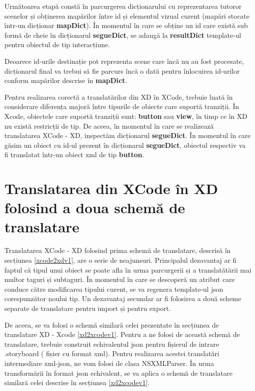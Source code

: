 Următoarea etapă constă în parcurgerea dicționarului cu reprezentarea tutoror scenelor și obținerea mapărilor între id și elementul vizual curent (mapări stocate într-un dicționar \textbf{mapDict}). În momentul în care se obține un id care există sub formă de cheie în dicționarul \textbf{segueDict}, se adaugă la \textbf{resultDict} template-ul pentru obiectul de tip interacțiune. 

Deoarece id-urile destinație pot reprezenta scene care încă nu au fost procesate, dicționarul final va trebui să fie parcurs încă o dată pentru înlocuirea id-urilor conform mapărilor descrise în \textbf{mapDict}.

Pentru realizarea corectă a translatărilor din XD în XCode, trebuie luată în considerare diferența majoră între tipurile de obiecte care suportă tranziții. În Xcode, obiectele care suportă tranziții sunt: \textbf{button} sau \textbf{view}, în timp ce în XD nu există restricții de tip. De aceea, în momentul în care se realizează translatarea XCode - XD, inspectăm dicționarul \textbf{segueDict}. În momentul în care găsim un obiect cu id-ul prezent în dicționarul \textbf{segueDict}, obiectul respectiv va fi translatat într-un obiect xml de tip \textbf{button}.

\section {Translatarea din XCode în XD folosind a doua schemă de translatare} \label{xcxd2schema}

Translatarea XCode - XD folosind prima schemă de translatare, descrisă în secțiunea \ref{xcode2xdv1}, are o serie de neajunsuri. Principalul dezavantaj ar fi faptul că tipul unui obiect se poate afla în urma parcurgerii și a translatătării mai multor taguri și subtaguri. În momentul în care se descoperă un atribut care conduce către modificarea tipului curent, se va regenera template-ul json corespunzător noului tip.  
Un dezavantaj secundar ar fi folosirea a două scheme separate de translatare pentru import și pentru export.

De aceea, se va folosi o schemă similară celei prezentate în secțiunea de translatare XD - Xcode \ref{xd2xcodev1}. Pentru a ne folosi de această schemă de translatare, trebuie construit echivalentul json pentru fișierul de intrare .storyboard ( fișier cu format xml). Pentru realizarea acestei translatări intermediare xml-json, ne vom folosi de clasa NSXMLParser. În urma transformării în format json echivalent, se va aplica o schemă de translatare similară celei descrise în secțiunea \ref{xd2xcodev1}.


